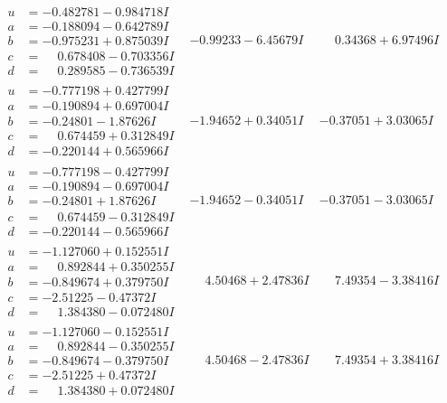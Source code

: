 \documentclass[1p]{elsarticle_modified}
\theoremstyle{definition}
\begin{document}
$$\begin{array}{c|c|c}
\begin{aligned}
u &= -0.482781 - 0.984718 I \\
a &= -0.188094 - 0.642789 I \\
b &= -0.975231 + 0.875039 I \\
c &= \phantom{-}0.678408 - 0.703356 I \\
d &= \phantom{-}0.289585 - 0.736539 I\end{aligned}
 & -0.99233 - 6.45679 I & \phantom{-}0.34368 + 6.97496 I \\ \hline\begin{aligned}
u &= -0.777198 + 0.427799 I \\
a &= -0.190894 + 0.697004 I \\
b &= -0.24801 - 1.87626 I \\
c &= \phantom{-}0.674459 + 0.312849 I \\
d &= -0.220144 + 0.565966 I\end{aligned}
 & -1.94652 + 0.34051 I & -0.37051 + 3.03065 I \\ \hline\begin{aligned}
u &= -0.777198 - 0.427799 I \\
a &= -0.190894 - 0.697004 I \\
b &= -0.24801 + 1.87626 I \\
c &= \phantom{-}0.674459 - 0.312849 I \\
d &= -0.220144 - 0.565966 I\end{aligned}
 & -1.94652 - 0.34051 I & -0.37051 - 3.03065 I \\ \hline\begin{aligned}
u &= -1.127060 + 0.152551 I \\
a &= \phantom{-}0.892844 + 0.350255 I \\
b &= -0.849674 + 0.379750 I \\
c &= -2.51225 - 0.47372 I \\
d &= \phantom{-}1.384380 - 0.072480 I\end{aligned}
 & \phantom{-}4.50468 + 2.47836 I & \phantom{-}7.49354 - 3.38416 I \\ \hline\begin{aligned}
u &= -1.127060 - 0.152551 I \\
a &= \phantom{-}0.892844 - 0.350255 I \\
b &= -0.849674 - 0.379750 I \\
c &= -2.51225 + 0.47372 I \\
d &= \phantom{-}1.384380 + 0.072480 I\end{aligned}
 & \phantom{-}4.50468 - 2.47836 I & \phantom{-}7.49354 + 3.38416 I\\

\end{array}$$
\end{document}
